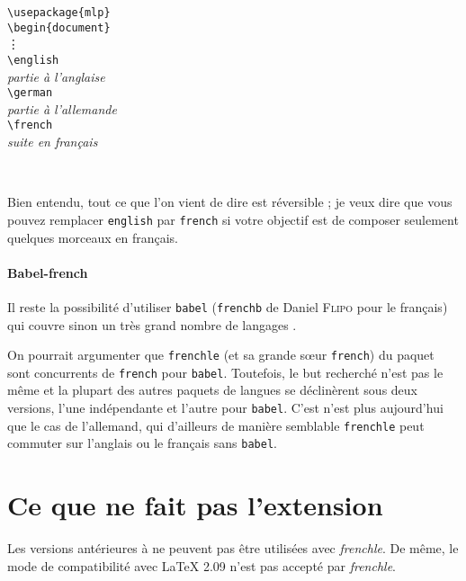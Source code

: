 \documentclass[a4paper,12pt,openright]{article}
\begin{document}
\begin{description}
\begin{center}
{\begin{minipage}{80mm}
\texttt{\backslash{}usepackage\{{mlp}\}}\\
\texttt{\backslash{}begin\{document\}}\\
\vdots\\
\texttt{\backslash{}english}\\
\textit{partie à l’anglaise}\\
\texttt{\backslash{}german}\\
\textit{partie à l’allemande}\\
\texttt{\backslash{}french}\\
\textit{suite en français}
\end{minipage}
}\\[1ex]
\end{center}
\end{description}

Bien entendu, tout ce que l’on vient de dire est réversible ; je veux dire que
vous pouvez remplacer \texttt{english} par \texttt{french} si votre objectif est de composer
seulement quelques morceaux en français.
\paragraph*{Babel-french}\MAJ 
Il reste  la possibilité d'utiliser  \texttt{babel}  
(\texttt{frenchb} de Daniel \textsc{Flipo}  pour le français)
qui couvre sinon un très grand nombre 
de langages .

On pourrait argumenter que  \texttt{frenchle} (et  sa grande sœur \texttt{french}) du paquet \cefr{}
sont concurrents de \texttt{french}  pour \texttt{babel}.
Toutefois, le but recherché n'est pas le même et la plupart des autres paquets de langues se déclinèrent sous deux versions,
l'une indépendante et l'autre pour  \texttt{babel}. C'est n'est plus aujourd'hui que le cas de l'allemand, qui d'ailleurs de
manière semblable  \texttt{frenchle} peut commuter sur l'anglais ou le français sans \texttt{babel}.

\endMAJ

\section{Ce que ne fait pas l'extension}
Les versions antérieures à \LaTeXe{} ne peuvent pas être utilisées avec \textit{frenchle}.
De même, le mode de compatibilité avec \LaTeX{} 2.09 n’est pas accepté par
\textit{frenchle}.
\end{document}
